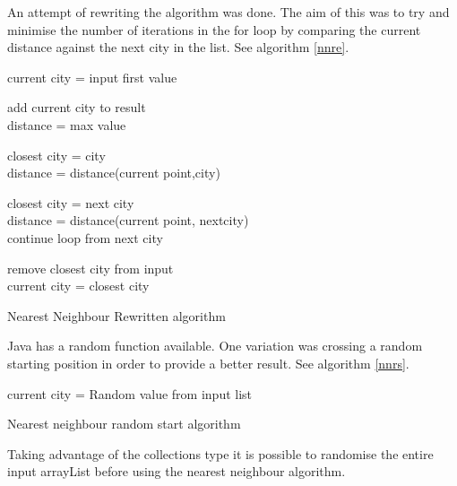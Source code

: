 \documentclass[conference,backref=page]{acmsiggraph}
\begin{document}
An attempt of rewriting the algorithm was done. The aim of this was to try and minimise the number of iterations in the for loop by comparing the current distance against the next city in the list. See algorithm \ref{nnre}.
\begin{algorithm}[h]
	current city = input first value\\
	{
		add current city to result\\
		distance = max value\\
		{
			{
				closest city = city\\
				distance = distance(current point,city)\\
			}
			{
				{
					
					closest city = next city \\
					distance = distance(current point, nextcity)\\
					continue loop from next city\\
				}
			}
		}
		remove closest city from input\\
		current city = closest city\\
	}
	\caption{Nearest Neighbour Rewritten algorithm}
	\label{nnre}
\end{algorithm}


Java has a random function available. One variation was crossing a random starting position in order to provide a better result. See algorithm \ref{nnrs}.


	\begin{algorithm}[h]	
		current city = Random value from input list\\
		\caption{Nearest neighbour random start algorithm}
		\label{nnrs}
	\end{algorithm}	
Taking advantage of the collections type it is possible to 	randomise the entire input arrayList before using the nearest neighbour algorithm.
		
\end{document}
